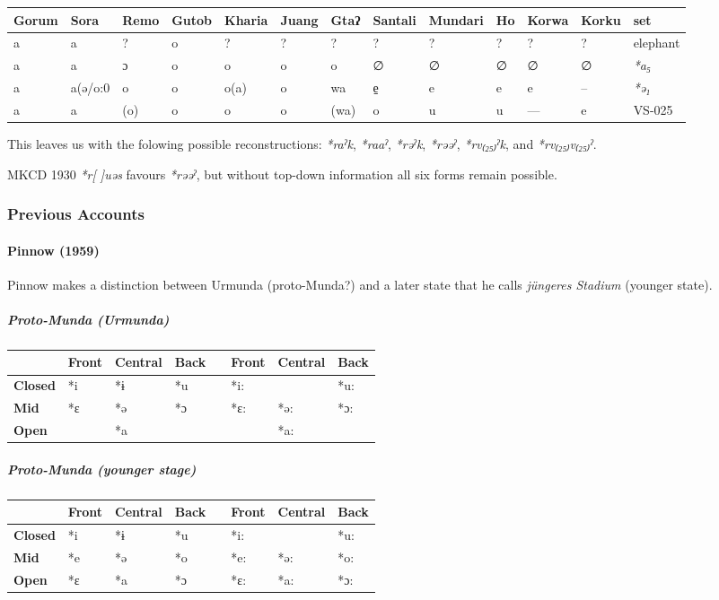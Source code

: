\documentclass[a4paper,]{article}
\let\oldparagraph\paragraph
\renewcommand{\paragraph}[1]{\oldparagraph{#1}\mbox{}}
\let\oldsubparagraph\subparagraph
\renewcommand{\subparagraph}[1]{\oldsubparagraph{#1}\mbox{}}
\begin{document}
\begin{longtable}[]{@{}lllllllllllll@{}}
\toprule
Gorum & Sora & Remo & Gutob & Kharia & Juang & Gtaʔ & Santali & Mundari
& Ho & Korwa & Korku & set\tabularnewline
\midrule
\endhead
a & a & ? & o & ? & ? & ? & ? & ? & ? & ? & ? & elephant\tabularnewline
a & a & ɔ & o & o & o & o & ∅ & ∅ & ∅ & ∅ & ∅ &
\emph{*a₅}\tabularnewline
a & a(ə/o:0 & o & o & o(a) & o & wa & e̠ & e & e & e & -- &
\emph{*ə₁}\tabularnewline
a & a & (o) & o & o & o & (wa) & o & u & u & --- & e &
VS-025\tabularnewline
\bottomrule
\end{longtable}

This leaves us with the folowing possible reconstructions: \emph{*raˀk},
\emph{*raaˀ}, \emph{*rəˀk}, \emph{*rəəˀ}, \emph{*rv₍₂₅₎ˀk}, and
\emph{*rv₍₂₅₎v₍₂₅₎ˀ}.

MKCD 1930 \emph{*r{[} {]}uəs} favours \emph{*rəəˀ}, but without top-down
information all six forms remain possible.

\subsubsection{Previous Accounts}\label{previous-accounts}

\paragraph{Pinnow (1959)}\label{pinnow-1959}

Pinnow makes a distinction between Urmunda (proto-Munda?) and a later
state that he calls \emph{jüngeres Stadium} (younger state).

\subparagraph{Proto-Munda (Urmunda)}\label{proto-munda-urmunda}

\begin{longtable}[]{@{}llllllll@{}}
\toprule
& Front & Central & Back & & Front & Central & Back\tabularnewline
\midrule
\endhead
\textbf{Closed} & *i & *ɨ & *u & & *i: & & *u:\tabularnewline
\textbf{Mid} & *ɛ & *ə & *ɔ & & *ɛ: & *ə: & *ɔ:\tabularnewline
\textbf{Open} & & *a & & & & *a: &\tabularnewline
\bottomrule
\end{longtable}

\subparagraph{Proto-Munda (younger
stage)}\label{proto-munda-younger-stage}

\begin{longtable}[]{@{}llllllll@{}}
\toprule
& Front & Central & Back & & Front & Central & Back\tabularnewline
\midrule
\endhead
\textbf{Closed} & *i & *ɨ & *u & & *i: & & *u:\tabularnewline
\textbf{Mid} & *e & *ə & *o & & *e: & *ə: & *o:\tabularnewline
\textbf{Open} & *ɛ & *a & *ɔ & & *ɛ: & *a: & *ɔ:\tabularnewline
\bottomrule
\end{longtable}
\end{document}
